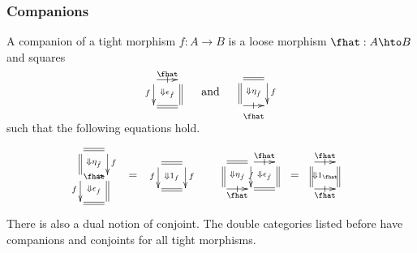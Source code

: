 \documentclass{beamer}
\begin{document}
\begin{frame}
  \frametitle{Companions}
  A \alert{companion} of a tight morphism $f:A\to B$ is a loose morphism $\fhat : A\hto B$ and squares
  \begin{equation*}
    \begin{array}{c}
      \xymatrix@-.5pc{
        \ar[r]|-@{|}^-{\smash{\fhat}} \ar[d]_f \ar@{}[dr]|{\Downarrow \epsilon_{\hat{f}} }
        & \ar@{=}[d]\\
        \ar@{=}[r] & }
    \end{array}\quad\text{and}\quad
    \begin{array}{c}
      \xymatrix@-.5pc{
        \ar@{=}[r] \ar@{=}[d] \ar@{}[dr]|{\Downarrow \eta_{\hat{f}}}
        & \ar[d]^f\\
        \ar[r]|-@{|}_-{\smash{\raisebox{-3mm}{$\scriptstyle\fhat$}}} & }
    \end{array}
  \end{equation*}
  such that the following equations hold.
  \begin{align}\label{eq:compeqn}
    \begin{array}{c}
      \xymatrix@-.5pc{
        \ar@{=}[r] \ar@{=}[d] \ar@{}[dr]|{\Downarrow \eta_{\hat{f}}}
        & \ar[d]^f\\
        \ar[r]|-{\fhat} \ar[d]_f \ar@{}[dr]|
        {\Downarrow  \epsilon_{\hat{f}} }
        & \ar@{=}[d]\\
        \ar@{=}[r] & }
    \end{array} &= 
    \begin{array}{c}
      \xymatrix@-.5pc{ \ar@{=}[r] \ar[d]_f
        \ar@{}[dr]|{\Downarrow 1_f} &  \ar[d]^f\\
        \ar@{=}[r] & }
    \end{array}
    &
    \begin{array}{c}
      \xymatrix@-.5pc{
        \ar@{=}[r] \ar@{=}[d] \ar@{}[dr]|{ \Downarrow \eta_{\hat{f}}}&
        \ar[r]|-@{|}^{\fhat}\ar[d]|f \ar@{}[dr]|{\Downarrow  \epsilon_{\hat{f}} }
        & \ar@{=}[d]\\
        \ar[r]|-@{|}_-{\fhat} &
        \ar@{=}[r] &}
    \end{array} &=
    \begin{array}{c}
      \xymatrix@-.5pc{
        \ar[r]|-@{|}^-{\fhat} \ar@{=}[d] \ar@{}[dr]|{\Downarrow 1_{\fhat}}
        & \ar@{=}[d]\\
        \ar[r]|-@{|}_-{\fhat} & }
    \end{array}
  \end{align}
  There is also a dual notion of \alert{conjoint}.
  The double categories listed before have companions and conjoints for all tight morphisms.
\end{frame}
\end{document}
